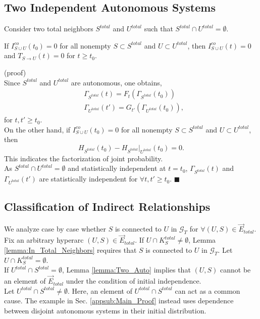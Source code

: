 \documentclass{comnet}%
\begin{document}
\subsection{\label{appsub:Two_Autonomous} Two Independent Autonomous Systems}
Consider two total neighbors $S^{total}$ and $U^{total}$ such that $S^{total} \cap U^{total} = \emptyset$.
\begin{lemma}
	If $I^{co}_{S \cup U}(t_0) = 0$ for all nonempty $S \subset S^{total}$ and $U \subset U^{total}$, then $I^{co}_{S \cup U}(t) = 0$ and $T_{S \to U}(t) = 0$ for $t \geqslant t_{0}$.
	\label{lemma:Two_Auto}\end{lemma}
(proof)\\
Since $S^{total}$ and $U^{total}$ are autonomous, one obtains,
\begin{equation}\begin{aligned}
		&\Gamma_{S^{total}}(t) = F_{t}(\Gamma_{S^{total}}(t_{0}))\\
		&\Gamma_{U^{total}}(t') = G_{t'}(\Gamma_{U^{total}}(t_{0})),
\end{aligned}\end{equation}
for $t, t' \geqslant t_{0}$.\\
On the other hand, if $I^{co}_{S \cup U}(t_0) = 0$ for all nonempty $S \subset S^{total}$ and $U \subset U^{total}$, then
\[
 H_{S^{total}}(t_0) - H_{S^{total}}|_{U^{total}}(t_0) = 0.
\]
This indicates the factorization of joint probability.\\
As $S^{total} \cap U^{total} = \emptyset$ and statistically independent at $t = t_{0}$, $\Gamma_{S^{total}}(t)$ and $\Gamma_{U^{total}}(t')$ are statistically independent for $\forall t, t' \geqslant t_{0}$. $\blacksquare$

\subsection{\label{appsub:Classification} Classification of Indirect Relationships}
We analyze case by case whether $S$ is connected to $U$ in $\mathcal{G}_{T}$ for $\forall (U, S) \in \overrightarrow{E}_{total}$. Fix an arbitrary hyperarc $(U, S) \in \overrightarrow{E}_{total}$. If $U \cap K^{total}_{S} \not= \emptyset$, Lemma \ref{lemma:In_Total_Neighbors} requires that $S$ is connected to $U$ in $\mathcal{G}_{T}$. Let $U \cap K^{total}_{S} = \emptyset$.\\
If $U^{total} \cap S^{total} = \emptyset$, Lemma \ref{lemma:Two_Auto} implies that $(U, S)$ cannot be an element of $\overrightarrow{E}_{total}$ under the condition of initial independence.\\
Let $U^{total} \cap S^{total} \not= \emptyset$. Here, an element of $U^{total} \cap S^{total}$ can act as a common cause. The example in Sec. \ref{appsub:Main_Proof} instead uses dependence between disjoint autonomous systems in their initial distribution.
\end{document}
